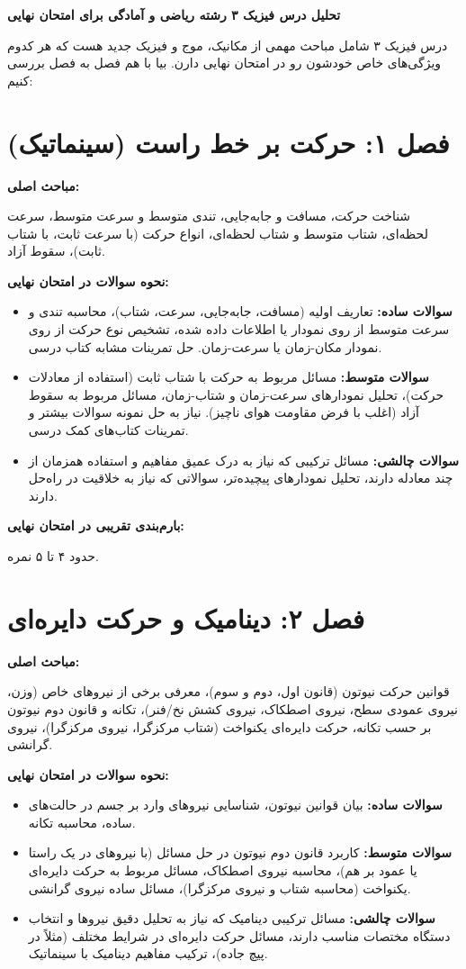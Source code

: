 \documentclass[12pt]{article}
\newcommand{\parahead}[1]{\par\vspace{0.5ex}\noindent\textbf{#1}\par\nopagebreak[4]\vspace{0.5ex}}
\begin{document}
\begin{center}
    \Large\textbf{تحلیل درس فیزیک ۳ رشته ریاضی و آمادگی برای امتحان نهایی}
\end{center}
\vspace{0.5cm}

درس فیزیک ۳ شامل مباحث مهمی از مکانیک، موج و فیزیک جدید هست که هر کدوم ویژگی‌های خاص خودشون رو در امتحان نهایی دارن. بیا با هم فصل به فصل بررسی کنیم:

\section{فصل ۱: حرکت بر خط راست (سینماتیک)}

\parahead{مباحث اصلی:}
شناخت حرکت، مسافت و جابه‌جایی، تندی متوسط و سرعت متوسط، سرعت لحظه‌ای، شتاب متوسط و شتاب لحظه‌ای، انواع حرکت (با سرعت ثابت، با شتاب ثابت)، سقوط آزاد.

\parahead{نحوه سوالات در امتحان نهایی:}
\begin{itemize}
    \item \textbf{سوالات ساده:} تعاریف اولیه (مسافت، جابه‌جایی، سرعت، شتاب)، محاسبه تندی و سرعت متوسط از روی نمودار یا اطلاعات داده شده، تشخیص نوع حرکت از روی نمودار مکان-زمان یا سرعت-زمان. حل تمرینات مشابه کتاب درسی.
    \item \textbf{سوالات متوسط:} مسائل مربوط به حرکت با شتاب ثابت (استفاده از معادلات حرکت)، تحلیل نمودارهای سرعت-زمان و شتاب-زمان، مسائل مربوط به سقوط آزاد (اغلب با فرض مقاومت هوای ناچیز). نیاز به حل نمونه سوالات بیشتر و تمرینات کتاب‌های کمک درسی.
    \item \textbf{سوالات چالشی:} مسائل ترکیبی که نیاز به درک عمیق مفاهیم و استفاده همزمان از چند معادله دارند، تحلیل نمودارهای پیچیده‌تر، سوالاتی که نیاز به خلاقیت در راه‌حل دارند.
\end{itemize}

\parahead{بارم‌بندی تقریبی در امتحان نهایی:}
حدود ۴ تا ۵ نمره.

\section{فصل ۲: دینامیک و حرکت دایره‌ای}

\parahead{مباحث اصلی:}
قوانین حرکت نیوتون (قانون اول، دوم و سوم)، معرفی برخی از نیروهای خاص (وزن، نیروی عمودی سطح، نیروی اصطکاک، نیروی کشش نخ/فنر)، تکانه و قانون دوم نیوتون بر حسب تکانه، حرکت دایره‌ای یکنواخت (شتاب مرکزگرا، نیروی مرکزگرا)، نیروی گرانشی.

\parahead{نحوه سوالات در امتحان نهایی:}
\begin{itemize}
    \item \textbf{سوالات ساده:} بیان قوانین نیوتون، شناسایی نیروهای وارد بر جسم در حالت‌های ساده، محاسبه تکانه.
    \item \textbf{سوالات متوسط:} کاربرد قانون دوم نیوتون در حل مسائل (با نیروهای در یک راستا یا عمود بر هم)، محاسبه نیروی اصطکاک، مسائل مربوط به حرکت دایره‌ای یکنواخت (محاسبه شتاب و نیروی مرکزگرا)، مسائل ساده نیروی گرانشی.
    \item \textbf{سوالات چالشی:} مسائل ترکیبی دینامیک که نیاز به تحلیل دقیق نیروها و انتخاب دستگاه مختصات مناسب دارند، مسائل حرکت دایره‌ای در شرایط مختلف (مثلاً در پیچ جاده)، ترکیب مفاهیم دینامیک با سینماتیک.
\end{itemize}
\end{document}
